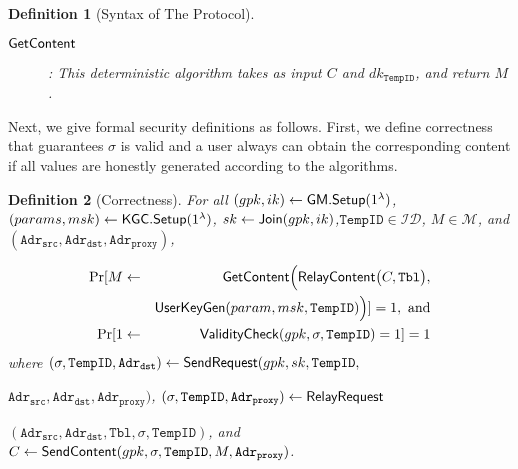 \documentclass[preprint]{sig-alternate}
\newtheorem{definition}{Definition}[section]
\begin{document}
\begin{definition}[Syntax of The Protocol]
\begin{description}
\item[${\sf GetContent}$]: This deterministic algorithm takes as input $C$ and $dk_{\mathtt{TempID}}$, and return $M$. 
\end{description}
\end{definition}


Next, we give formal security definitions as follows. 
First, we define correctness that guarantees $\sigma$ is valid and a user always can obtain the corresponding content if all values are honestly generated according to the algorithms.

\begin{definition}[Correctness]
For all $(gpk,ik)\leftarrow {\sf GM.Setup}\allowbreak(1^\lambda)$, 
$(params,msk)\leftarrow {\sf KGC.Setup}(1^\lambda)$, 
$sk\leftarrow \linebreak {\sf Join}(gpk,ik)$,\allowbreak $\mathtt{TempID}\in\mathcal{ID}$, $M\in\mathcal{M}$, and $(\mathtt{Adr_{src}},\mathtt{Adr_{dst}},\allowbreak \mathtt{Adr_{proxy}})$, 

\begin{eqnarray*}
\Pr[M\leftarrow&&{\sf GetContent}\Big{(}{\sf RelayContent}\big{(}C,\mathtt{Tbl}\big{)},\\
&&{\sf UserKeyGen}(param, msk, \mathtt{TempID})\Big{)}]=1,~\text{and}\\
\Pr[1\leftarrow&&{\sf ValidityCheck}(gpk,\sigma,\mathtt{TempID})=1]=1
\end{eqnarray*}
\noindent 
where $(\sigma,\mathtt{TempID},\mathtt{Adr_{dst}})\leftarrow{\sf SendRequest}(gpk,sk,\mathtt{TempID},\allowbreak $

\noindent$\mathtt{Adr_{src}},\allowbreak \mathtt{Adr_{dst}},\mathtt{Adr_{proxy}})$, $(\sigma,\mathtt{TempID},\mathtt{Adr_{proxy}})\leftarrow{\sf RelayRequest}$

\noindent$(\mathtt{Adr_{src}},\allowbreak \mathtt{Adr_{dst}},\allowbreak \mathtt{Tbl},\sigma, \mathtt{TempID})$, and $C\leftarrow {\sf SendContent}(gpk,\sigma,\allowbreak \mathtt{TempID},\allowbreak M,\allowbreak \mathtt{Adr_{proxy}})$.
\end{definition}
\end{document}

